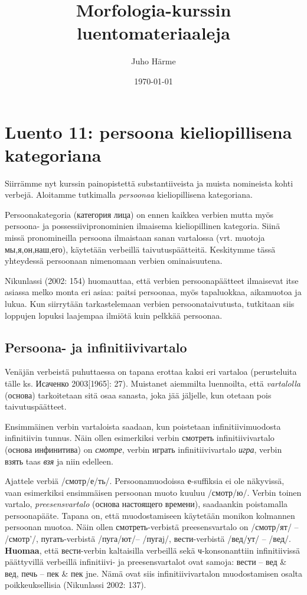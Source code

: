 \documentclass[]{scrartcl}
\author{Juho Härme}
\title{Morfologia-kurssin luentomateriaaleja}
\date{\today}
\begin{document}
\maketitle
\tableofcontents
\newpage



\section{Luento 11: persoona kieliopillisena
kategoriana}\label{luento-11-persoona-kieliopillisena-kategoriana}

Siirrämme nyt kurssin painopistettä substantiiveista ja muista
nomineista kohti verbejä. Aloitamme tutkimalla \emph{persoonaa}
kieliopillisena kategoriana.

Persoonakategoria (категория лица) on ennen kaikkea verbien mutta myös
persoona- ja possessiivipronominien ilmaisema kieliopillinen kategoria.
Siinä missä pronomineilla persoona ilmaistaan sanan vartalossa (vrt.
muotoja мы,я,он,наш,его), käytetään verbeillä taivutuspäätteitä.
Keskitymme tässä yhteydessä persoonaan nimenomaan verbien ominaisuutena.

Nikunlassi (2002: 154) huomauttaa, että verbien persoonapäätteet
ilmaisevat itse asiassa melko monta eri asiaa: paitsi persoonaa, myös
tapaluokkaa, aikamuotoa ja lukua. Kun siirrytään tarkastelemaan verbien
persoonataivutusta, tutkitaan siis loppujen lopuksi laajempaa ilmiötä
kuin pelkkää persoonaa.

\subsection{Persoona- ja
infinitiivivartalo}\label{persoona--ja-infinitiivivartalo}

Venäjän verbeistä puhuttaessa on tapana erottaa kaksi eri vartaloa
(perusteluita tälle ks. Исаченко 2003{[}1965{]}: 27). Muistanet
aiemmilta luennoilta, että \emph{vartalolla} (основа) tarkoitetaan sitä
osaa sanasta, joka jää jäljelle, kun otetaan pois taivutuspäätteet.

Ensimmäinen verbin vartaloista saadaan, kun poistetaan
infinitiivimuodosta infinitiivin tunnus. Näin ollen esimerkiksi verbin
смотреть infinitiivivartalo (основа инфинитива) on \emph{смотре}, verbin
играть infinitiivivartalo \emph{игра}, verbin взять taas \emph{взя} ja
niin edelleen.

Ajattele verbiä /смотр/е/ть/. Persoonamuodoissa е-suffiksia ei ole
näkyvissä, vaan esimerkiksi ensimmäisen persoonan muoto kuuluu
/смотр/ю/. Verbin toinen vartalo, \emph{preesensvartalo} (основа
настоящего времени), saadaankin poistamalla persoonapääte. Tapana on,
että muodostamiseen käytetään monikon kolmannen persoonan muotoa. Näin
ollen смотреть-verbistä preesensvartalo on /смотр/ят/ -- /смотр'/,
пугать-verbistä /пуга/ют/-- /пугаj/, вести-verbistä /вед/ут/ -- /вед/.
\textbf{Huomaa}, että вести-verbin kaltaisilla verbeillä sekä
ч-konsonanttiin infinitiivissä päättyvillä verbeillä infinitiivi- ja
preesensvartalot ovat samoja: вести -- вед \& вед, печь -- пек \& пек
jne. Nämä ovat siis infinitiivivartalon muodostamisen osalta
poikkeuksellisia (Nikunlassi 2002: 137).
\end{document}
